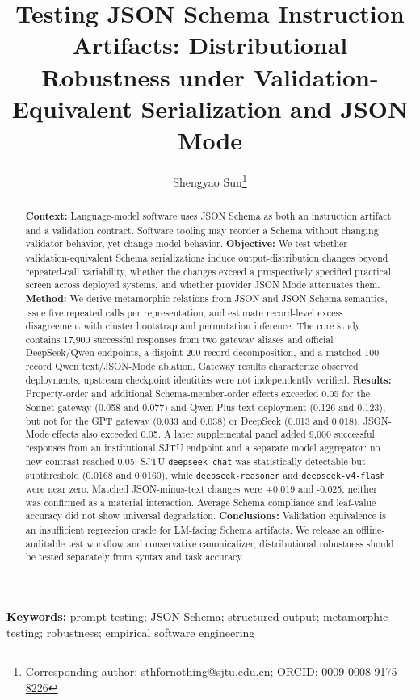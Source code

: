 \documentclass[11pt,a4paper]{article}
\title{Testing JSON Schema Instruction Artifacts: Distributional Robustness under Validation-Equivalent Serialization and JSON Mode}
\author{Shengyao Sun\thanks{Corresponding author: \href{mailto:sthfornothing@sjtu.edu.cn}{sthfornothing@sjtu.edu.cn}; ORCID: \href{https://orcid.org/0009-0008-9175-8226}{0009-0008-9175-8226}}}
\affil{Shanghai Jiao Tong University, Shanghai, China}
\date{}
\begin{document}
\maketitle
\begin{abstract}
\textbf{Context:} Language-model software uses JSON Schema as both an instruction artifact and a validation contract. Software tooling may reorder a Schema without changing validator behavior, yet change model behavior. \textbf{Objective:} We test whether validation-equivalent Schema serializations induce output-distribution changes beyond repeated-call variability, whether the changes exceed a prospectively specified practical screen across deployed systems, and whether provider JSON Mode attenuates them. \textbf{Method:} We derive metamorphic relations from JSON and JSON Schema semantics, issue five repeated calls per representation, and estimate record-level excess disagreement with cluster bootstrap and permutation inference. The core study contains 17,900 successful responses from two gateway aliases and official DeepSeek/Qwen endpoints, a disjoint 200-record decomposition, and a matched 100-record Qwen text/JSON-Mode ablation. Gateway results characterize observed deployments; upstream checkpoint identities were not independently verified. \textbf{Results:} Property-order and additional Schema-member-order effects exceeded 0.05 for the Sonnet gateway (0.058 and 0.077) and Qwen-Plus text deployment (0.126 and 0.123), but not for the GPT gateway (0.033 and 0.038) or DeepSeek (0.013 and 0.018). JSON-Mode effects also exceeded 0.05. A later supplemental panel added 9,000 successful responses from an institutional SJTU endpoint and a separate model aggregator: no new contrast reached 0.05; SJTU \texttt{deepseek-chat} was statistically detectable but subthreshold (0.0168 and 0.0160), while \texttt{deepseek-reasoner} and \texttt{deepseek-v4-flash} were near zero. Matched JSON-minus-text changes were +0.019 and -0.025; neither was confirmed as a material interaction. Average Schema compliance and leaf-value accuracy did not show universal degradation. \textbf{Conclusions:} Validation equivalence is an insufficient regression oracle for LM-facing Schema artifacts. We release an offline-auditable test workflow and conservative canonicalizer; distributional robustness should be tested separately from syntax and task accuracy.
\end{abstract}
\noindent\textbf{Keywords:} prompt testing; JSON Schema; structured output; metamorphic testing; robustness; empirical software engineering
\end{document}
